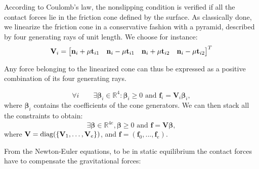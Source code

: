 According to Coulomb's law, the nonslipping condition is verified if all the contact forces lie in the friction cone defined by the surface.
As classically done, we linearize the friction cone in a conservative fashion with a pyramid, described by four generating rays of unit length. We choose for instance:
\begin{equation*}
\mathbf{V}_{i} = \begin{bmatrix}\mathbf{n}_{i} + \mu \mathbf{t}_{i1} & \mathbf{n}_{i} -\mu \mathbf{t}_{i1} & \mathbf{n}_{i} + \mu \mathbf{t}_{i2} & \mathbf{n}_{i} - \mu \mathbf{t}_{i2}\end{bmatrix}^T
\end{equation*}

Any force belonging to the linearized cone
can thus be expressed as a positive combination of its four generating rays.

\begin{equation*}
\forall i  \qquad  \exists \bm{\beta}_i \in \mathbb{R}^{4} : \bm{\beta}_i \ge 0 \text{ and } \mathbf{f}_{i} = \mathbf{V}_{i} \bm{\beta}_i,
\end{equation*}
where $\bm{\beta}_i$ contains the coefficients of the cone generators.
We can then stack all the constraints to obtain:
\begin{equation}\label{eq:gen}
\exists \bm{\beta} \in \mathbb{R}^{4e} ,  \bm{\beta} \ge 0 \text{ and } \mathbf{f} = \mathbf{V} \bm{\beta},
\end{equation}
where $\mathbf{V} = \text{diag}( \{\mathbf{V}_1, \dots, \mathbf{V}_e\} )$, and $\mathbf{f} = (\mathbf{f}_0,...,\mathbf{f}_e)$.

From the Newton-Euler equations, to be in static equilibrium the contact forces have to compensate the gravitational forces:



